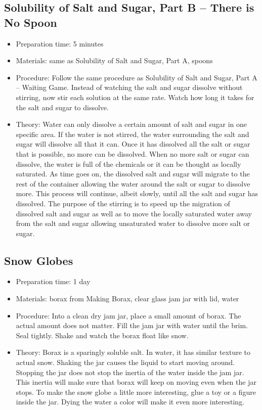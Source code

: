 \subsection{Solubility of Salt and Sugar, Part B -- There is No Spoon}
\begin{itemize}
\item{Preparation time: 5 minutes}
\item{Materials: same as Solubility of Salt and Sugar, Part A, spoons}
\item{Procedure: Follow the same procedure as Solubility of Salt and Sugar, Part A -- Waiting Game. Instead of watching the salt and sugar dissolve without stirring, now stir each solution at the same rate. Watch how long it takes for the salt and sugar to dissolve.}
\item{Theory: Water can only dissolve a certain amount of salt and sugar in one specific area. If the water is not stirred, the water surrounding the salt and sugar will dissolve all that it can. Once it has dissolved all the salt or sugar that is possible, no more can be dissolved. When no more salt or sugar can dissolve, the water is full of the chemicals or it can be thought as locally saturated. As time goes on, the dissolved salt and sugar will migrate to the rest of the container allowing the water around the salt or sugar to dissolve more. This process will continue, albeit slowly, until all the salt and sugar has dissolved. The purpose of the stirring is to speed up the migration of dissolved salt and sugar as well as to move the locally saturated water away from the salt and sugar allowing unsaturated water to dissolve more salt or sugar.}
\end{itemize}

\subsection{Snow Globes}
\begin{itemize}
\item{Preparation time: 1 day}
\item{Materials: borax from Making Borax, clear glass jam jar with lid, water}
\item{Procedure: Into a clean dry jam jar, place a small amount of borax. The actual amount does not matter. Fill the jam jar with water until the brim. Seal tightly. Shake and watch the borax float like snow.}
\item{Theory: Borax is a sparingly soluble salt. In water, it has similar texture to actual snow. Shaking the jar causes the liquid to start moving around. Stopping the jar does not stop the inertia of the water inside the jam jar. This inertia will make sure that borax will keep on moving even when the jar stops. To make the snow globe a little more interesting, glue a toy or a figure inside the jar. Dying the water a color will make it even more interesting.}
\end{itemize}

